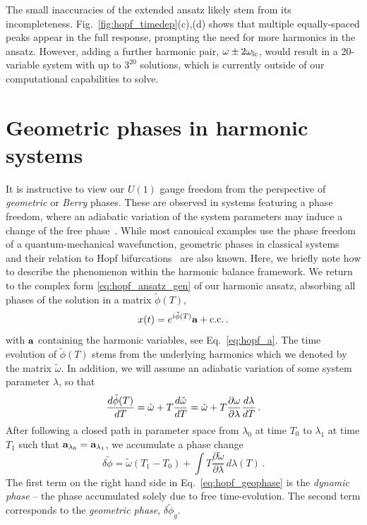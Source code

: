 The small inaccuracies of the extended ansatz likely stem from its incompleteness. Fig.~\ref{fig:hopf_timedep}(c),(d) shows that multiple equally-spaced peaks appear in the full response, prompting the need for more harmonics in the ansatz. 
However, adding a further harmonic pair, $\omega \pm 2 \omega_{\rm lc}$, would result in a 20-variable system with up to $3^{20}$ solutions, which is currently outside of our computational capabilities to solve. 


\section{Geometric phases in harmonic systems}

It is instructive to view our $U(1)$ gauge freedom from the perspective of \textit{geometric} or \textit{Berry} phases. These are observed in systems featuring a phase freedom, where an adiabatic variation of the system parameters may induce a change of the free phase~\cite{Cohen_2019, Berry_1988}. While most canonical examples use the phase freedom of a quantum-mechanical wavefunction, geometric phases in classical systems~\cite{Hannay_1985} and their relation to Hopf bifurcations~\cite{Ning_1992a, Ning_1992b} are also known. Here, we briefly note how to describe the phenomenon within the harmonic balance framework. We return to the complex form \eqref{eq:hopf_ansatz_gen} of our harmonic ansatz, absorbing all phases of the solution in a matrix $\tilde{\phi}(T)$, 
\begin{equation}
x(t) = e^{i \tilde{\phi}(T)} \vb{a} + \text{c.c.} \,.
\end{equation}
with $\vb{a}$ containing the harmonic variables, see Eq.~\eqref{eq:hopf_a}.
The time evolution of $\tilde{\phi}(T)$ stems from the underlying harmonics which we denoted by the matrix $\tilde{\omega}$. In addition, we will assume an adiabatic variation of some system parameter $\lambda$, so that
\begin{equation}
\frac{d \tilde{\phi}(T)}{d T} = \tilde{\omega} + T \frac{d \tilde{\omega}}{d T} = \tilde{\omega} + T \frac{\partial \omega}{\partial \lambda} \frac{d \lambda}{d T}\,.
\end{equation}
After following a closed path in parameter space from $\lambda_0$ at time $T_0$ to $\lambda_1$ at time $T_1$ such that $\vb{a}_{\lambda_0} = \vb{a}_{\lambda_1}$, we accumulate a phase change
\begin{equation} \label{eq:hopf_geophase}
\delta \tilde{\phi} = \tilde{\omega} \left(T_1-T_0 \right) +  \int T \frac{\partial \tilde{\omega}}{\partial \lambda} \, d\lambda(T)\,.
\end{equation}
The first term on the right hand side in Eq.~\eqref{eq:hopf_geophase} is the \textit{dynamic phase} -- the phase accumulated solely due to free time-evolution. The second term corresponds to the \textit{geometric phase}, $\delta \tilde{\phi}_g$.

